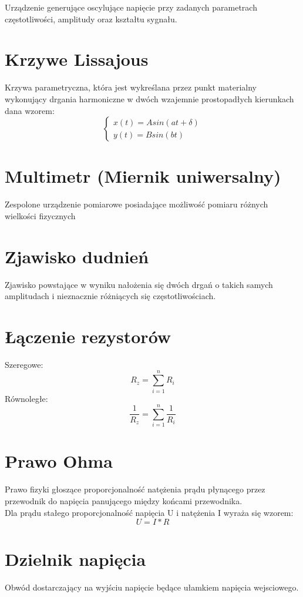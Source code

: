 Urządzenie generujące oscylujące napięcie przy zadanych parametrach
częstotliwości, amplitudy oraz kształtu sygnału.

\section{Krzywe Lissajous}

Krzywa parametryczna, która jest wykreślana przez punkt materialny wykonujący
drgania harmoniczne w dwóch wzajemnie prostopadłych kierunkach dana wzorem:
\begin{equation}
    \begin{cases}
        x(t) = Asin(at + \delta) \\
        y(t) = Bsin(bt)
    \end{cases}
\end{equation}

\section {Multimetr (Miernik uniwersalny)}

Zespolone urządzenie pomiarowe posiadające możliwość pomiaru różnych wielkości fizycznych

\section {Zjawisko dudnień}

Zjawisko powstające w wyniku nałożenia się dwóch drgań o takich samych amplitudach i nieznacznie różniących się częstotliwościach.

\section {Łączenie rezystorów}

Szeregowe:
\begin{equation} \label{szereg}
    R_z = \sum^{n}_{i=1}{R_i}
\end{equation}
Równoległe:
\begin{equation}
    \frac{1}{R_z} = \sum^{n}_{i=1}{\frac{1}{{R_i}}}
\end{equation}

\section {Prawo Ohma}

Prawo fizyki głoszące proporcjonalność natężenia prądu płynącego przez przewodnik do napięcia panującego między końcami przewodnika.\\
Dla prądu stałego proporcjonalność napięcia U i natężenia I wyraża się wzorem:
\begin{equation}
    U = I * R
\end{equation}

\section {Dzielnik napięcia}

Obwód dostarczający na wyjściu napięcie będące ułamkiem napięcia wejsciowego. 